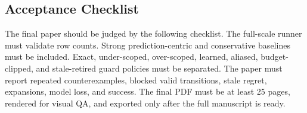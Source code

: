 \documentclass{article}
\begin{document}
\subsection{Acceptance Checklist}

The final paper should be judged by the following checklist. The full-scale
runner must validate row counts. Strong prediction-centric and conservative
baselines must be included. Exact, under-scoped, over-scoped, learned, aliased,
budget-clipped, and stale-retired guard policies must be separated. The paper
must report repeated counterexamples, blocked valid transitions, stale regret,
expansions, model loss, and success. The final PDF must be at least 25 pages,
rendered for visual QA, and exported only after the full manuscript is ready.



\end{document}
